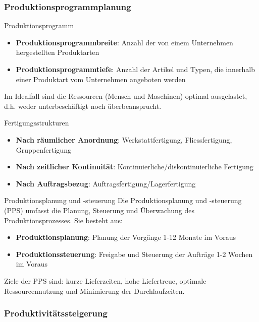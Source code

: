 \subsubsection{Produktionsprogrammplanung}

\begin{definition}{Produktionsprogramm}
\begin{itemize}
    \item \textbf{Produktionsprogrammbreite}: Anzahl der von einem Unternehmen hergestellten Produktarten
    \item \textbf{Produktionsprogrammtiefe}: Anzahl der Artikel und Typen, die innerhalb einer Produktart vom Unternehmen angeboten werden
\end{itemize}

Im Idealfall sind die Ressourcen (Mensch und Maschinen) optimal ausgelastet, d.h. weder unterbeschäftigt noch überbeansprucht.
\end{definition}

\begin{concept}{Fertigungsstrukturen}
\begin{itemize}
    \item \textbf{Nach räumlicher Anordnung}: Werkstattfertigung, Fliessfertigung, Gruppenfertigung
    \item \textbf{Nach zeitlicher Kontinuität}: Kontinuierliche/diskontinuierliche Fertigung
    \item \textbf{Nach Auftragsbezug}: Auftragsfertigung/Lagerfertigung
\end{itemize}
\end{concept}


\begin{definition}{Produktionsplanung und -steuerung}
Die Produktionsplanung und -steuerung (PPS) umfasst die Planung, Steuerung und Überwachung des Produktionsprozesses. Sie besteht aus:
\begin{itemize}
    \item \textbf{Produktionsplanung}: Planung der Vorgänge 1-12 Monate im Voraus
    \item \textbf{Produktionssteuerung}: Freigabe und Steuerung der Aufträge 1-2 Wochen im Voraus
\end{itemize}

Ziele der PPS sind: kurze Lieferzeiten, hohe Liefertreue, optimale Ressourcennutzung und Minimierung der Durchlaufzeiten.
\end{definition}


\subsubsection{Produktivitätssteigerung}

